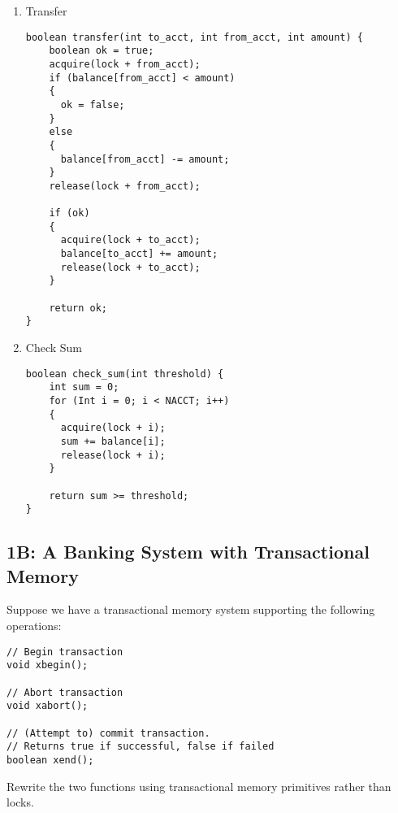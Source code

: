 \documentclass[11pt]{article}
\begin{document}
\begin{enumerate}
\item Transfer
\begin{lstlisting}
boolean transfer(int to_acct, int from_acct, int amount) {
    boolean ok = true;
    acquire(lock + from_acct);
    if (balance[from_acct] < amount)
    {
      ok = false;
    }
    else
    {
      balance[from_acct] -= amount;
    }
    release(lock + from_acct);

    if (ok)
    {
      acquire(lock + to_acct);
      balance[to_acct] += amount;
      release(lock + to_acct);
    }

    return ok;
}
\end{lstlisting}

\item Check Sum
\begin{lstlisting}
boolean check_sum(int threshold) {
    int sum = 0;
    for (Int i = 0; i < NACCT; i++)
    {
      acquire(lock + i);
      sum += balance[i];
      release(lock + i);
    }

    return sum >= threshold;
}
\end{lstlisting}
\end{enumerate}

\newpage
\subsection*{1B: A Banking System with Transactional Memory}

Suppose we have a transactional memory system supporting the following operations:
\begin{lstlisting}
// Begin transaction
void xbegin();

// Abort transaction
void xabort();

// (Attempt to) commit transaction.
// Returns true if successful, false if failed
boolean xend();
\end{lstlisting}

Rewrite the two functions using transactional memory primitives rather than locks.
\end{document}
